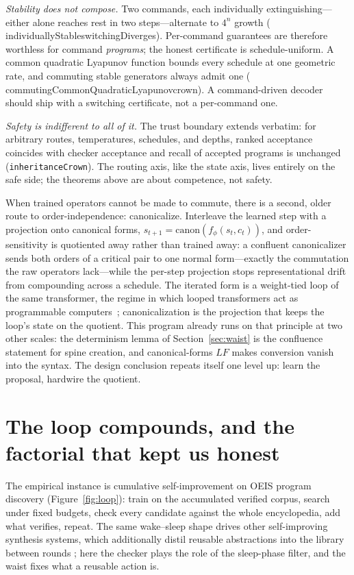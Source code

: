 \documentclass[11pt]{article}
\newcommand{\code}[1]{\texttt{#1}}
\newcommand{\leanname}[1]{{\scriptsize\ttfamily
  \def\_{\textunderscore\allowbreak}#1}}
\begin{document}
\emph{Stability does not compose.} Two commands, each individually
extinguishing---either alone reaches rest in two steps---alternate to $4^{n}$ growth
(\leanname{individuallyStable\_switchingDiverges}). Per-command guarantees are therefore
worthless for command \emph{programs}; the honest certificate is schedule-uniform. A
common quadratic Lyapunov function bounds every schedule at one geometric rate, and
commuting stable generators always admit one
(\leanname{commutingCommonQuadraticLyapunov\_crown}). A command-driven decoder should ship
with a switching certificate, not a per-command one.

\emph{Safety is indifferent to all of it.} The trust boundary extends verbatim: for
arbitrary routes, temperatures, schedules, and depths, ranked acceptance coincides with
checker acceptance and recall of accepted programs is unchanged
(\code{inheritanceCrown}). The routing axis, like the state axis, lives entirely on the
safe side; the theorems above are about competence, not safety.

When trained operators cannot be made to commute, there is a second, older route to
order-independence: canonicalize. Interleave the learned step with a projection onto
canonical forms, $s_{t+1} = \mathrm{canon}(f_{\phi}(s_t, c_t))$, and order-sensitivity
is quotiented away rather than trained away: a confluent canonicalizer sends both
orders of a critical pair to one normal form---exactly the commutation the raw
operators lack---while the per-step projection stops representational drift from
compounding across a schedule. The iterated form is a weight-tied loop of the same
transformer, the regime in which looped transformers act as programmable
computers~\cite{giannou2023}; canonicalization is the projection that keeps the loop's
state on the quotient. This program already runs on that principle at two other
scales: the determinism lemma of Section~\ref{sec:waist} is the confluence statement
for spine creation, and canonical-forms $LF$ makes conversion vanish into the syntax.
The design conclusion repeats itself one level up: learn the proposal, hardwire the
quotient.

\section{The loop compounds, and the factorial that kept us honest}
\label{sec:experiments}

The empirical instance is cumulative self-improvement on OEIS program discovery
\cite{gauthier2023} (Figure~\ref{fig:loop}): train on the accumulated verified corpus,
search under fixed budgets, check every candidate against the whole encyclopedia, add
what verifies, repeat. The same wake--sleep shape drives other self-improving synthesis
systems, which additionally distil reusable abstractions into the library between rounds
\cite{ellis2021}; here the checker plays the role of the sleep-phase filter, and the
waist fixes what a reusable action is.
\end{document}
